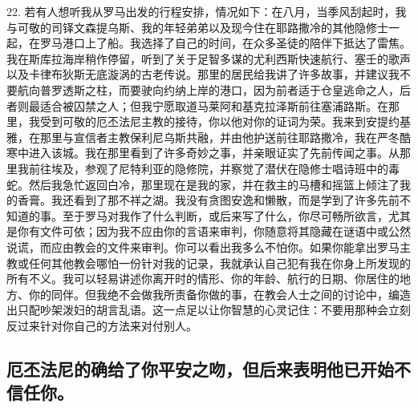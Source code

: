 22. 若有人想听我从罗马出发的行程安排，情况如下：在八月，当季风刮起时，我与可敬的司铎文森提乌斯、我的年轻弟弟以及现今住在耶路撒冷的其他隐修士一起，在罗马港口上了船。我选择了自己的时间，在众多圣徒的陪伴下抵达了雷焦。我在斯库拉海岸稍作停留，听到了关于足智多谋的尤利西斯快速航行、塞壬的歌声以及卡律布狄斯无底漩涡的古老传说。那里的居民给我讲了许多故事，并建议我不要航向普罗透斯之柱，而要驶向约纳上岸的港口，因为前者适于仓皇逃命之人，后者则最适合被囚禁之人；但我宁愿取道马莱阿和基克拉泽斯前往塞浦路斯。在那里，我受到可敬的厄丕法尼主教的接待，你以他对你的证词为荣。我来到安提约基雅，在那里与宣信者主教保利尼乌斯共融，并由他护送前往耶路撒冷，我在严冬酷寒中进入该城。我在那里看到了许多奇妙之事，并亲眼证实了先前传闻之事。从那里我前往埃及，参观了尼特利亚的隐修院，并察觉了潜伏在隐修士唱诗班中的毒蛇。然后我急忙返回白冷，那里现在是我的家，并在救主的马槽和摇篮上倾注了我的香膏。我还看到了那不祥之湖。我没有贪图安逸和懒散，而是学到了许多先前不知道的事。至于罗马对我作了什么判断，或后来写了什么，你尽可畅所欲言，尤其是你有文件可依；因为我不应由你的言语来审判，你随意将其隐藏在谜语中或公然说谎，而应由教会的文件来审判。你可以看出我多么不怕你。如果你能拿出罗马主教或任何其他教会哪怕一份针对我的记录，我就承认自己犯有我在你身上所发现的所有不义。我可以轻易讲述你离开时的情形、你的年龄、航行的日期、你居住的地方、你的同伴。但我绝不会做我所责备你做的事，在教会人士之间的讨论中，编造出只配吵架泼妇的胡言乱语。这一点足以让你智慧的心灵记住：不要用那种会立刻反过来针对你自己的方法来对付别人。\par


\subsection{厄丕法尼的确给了你平安之吻，但后来表明他已开始不信任你。}

